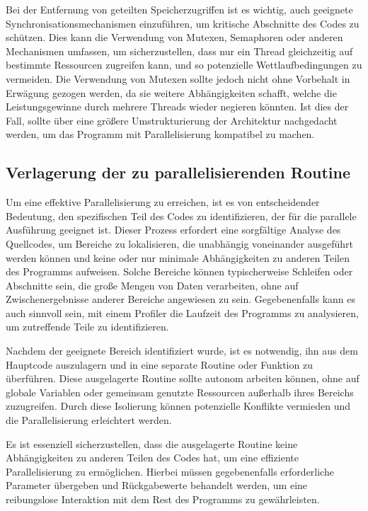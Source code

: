 Bei der Entfernung von geteilten Speicherzugriffen ist es wichtig, auch geeignete Synchronisationsmechanismen einzuführen, um kritische Abschnitte des Codes zu schützen. Dies kann die Verwendung von Mutexen, Semaphoren oder anderen Mechanismen umfassen, um sicherzustellen, dass nur ein Thread gleichzeitig auf bestimmte Ressourcen zugreifen kann, und so potenzielle Wettlaufbedingungen zu vermeiden. Die Verwendung von Mutexen sollte jedoch nicht ohne Vorbehalt in Erwägung gezogen werden, da sie weitere Abhängigkeiten schafft, welche die Leistungsgewinne durch mehrere Threads wieder negieren könnten. Ist dies der Fall, sollte über eine größere Umstrukturierung der Architektur nachgedacht werden, um das Programm mit Parallelisierung kompatibel zu machen.

\subsection{Verlagerung der zu parallelisierenden Routine}
\label{sec:Verlagerung_parallelisierende_Routine}
Um eine effektive Parallelisierung zu erreichen, ist es von entscheidender Bedeutung, den spezifischen Teil des Codes zu identifizieren, der für die parallele Ausführung geeignet ist. Dieser Prozess erfordert eine sorgfältige Analyse des Quellcodes, um Bereiche zu lokalisieren, die unabhängig voneinander ausgeführt werden können und keine oder nur minimale Abhängigkeiten zu anderen Teilen des Programms aufweisen. Solche Bereiche können typischerweise Schleifen oder Abschnitte sein, die große Mengen von Daten verarbeiten, ohne auf Zwischenergebnisse anderer Bereiche angewiesen zu sein. Gegebenenfalls kann es auch sinnvoll sein, mit einem Profiler die Laufzeit des Programms zu analysieren, um zutreffende Teile zu identifizieren.

Nachdem der geeignete Bereich identifiziert wurde, ist es notwendig, ihn aus dem Hauptcode auszulagern und in eine separate Routine oder Funktion zu überführen. Diese ausgelagerte Routine sollte autonom arbeiten können, ohne auf globale Variablen oder gemeinsam genutzte Ressourcen außerhalb ihres Bereichs zuzugreifen. Durch diese Isolierung können potenzielle Konflikte vermieden und die Parallelisierung erleichtert werden.

Es ist essenziell sicherzustellen, dass die ausgelagerte Routine keine Abhängigkeiten zu anderen Teilen des Codes hat, um eine effiziente Parallelisierung zu ermöglichen. Hierbei müssen gegebenenfalls erforderliche Parameter übergeben und Rückgabewerte behandelt werden, um eine reibungslose Interaktion mit dem Rest des Programms zu gewährleisten.


